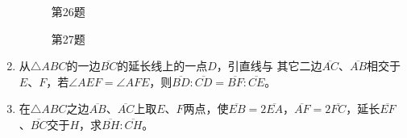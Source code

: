 \begin{enumerate}
\begin{figure}
    \begin{minipage}[t]{0.48\linewidth}
    \centering
\begin{tikzpicture}[>=latex, scale=1]
    \end{tikzpicture}
    \caption*{第26题}
    \end{minipage}
    \begin{minipage}[t]{0.48\linewidth}
    \centering
    \begin{tikzpicture}[>=latex, scale=1]
    \end{tikzpicture}
    \caption*{第27题}
    \end{minipage}
    \end{figure}

\item 从$\triangle ABC$的一边$\overline{BC}$的延长线上的一点$D$，引直线与
其它二边$\overline{AC}$、$\overline{AB}$相交于$E$、$F$，若$\angle AEF=\angle AFE$，则$\overline{BD}:\overline{CD}=\overline{BF}:\overline{CE}$。


\item 在$\triangle ABC$之边$\overline{AB}$、$\overline{AC}$上取$E$、$F$两点，使$\overline{EB}=2\overline{EA}$，$\overline{AF}=2\overline{FC}$，延长$\overline{EF}$、$\overline{BC}$交于$H$，求$\overline{BH}:\overline{CH}$。


\end{enumerate}

